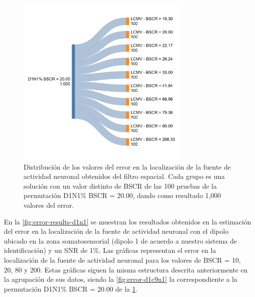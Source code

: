 \begin{figure}[t]
    \centering
    \includegraphics[width=0.75\textwidth]{gfx/individual_lod.png}
    \caption{Distribución de los valores del error en la localización de la fuente de actividad neuronal obtenidos del filtro espacial. Cada grupo es una solución con un valor distinto de BSCR de las 100 pruebas de la permutación D1N1\% BSCR = 20.00, dando como resultado 1,000 valores del error.}
    \label{fig:individual-lod}
\end{figure}

En la \cref{fig:error-results-d1n1} se muestran los resultados obtenidos en la estimación del error en la localización de la fuente de actividad neuronal con el dipolo ubicado en la zona somatosensorial (dipolo 1 de acuerdo a nuestro sistema de identificación) y un SNR de 1\%.
Las gráficas representan el error en la localización de la fuente de actividad neuronal para los valores de BSCR = 10, 20, 80 y 200.
Estas gráficas siguen la misma estructura descrita anteriormente en la agrupación de sus datos, siendo la \cref{fig:error-d1c9n1} la correspondiente a la permutación D1N1\% BSCR = 20.00 de la \cref{fig:individual-lod}.

